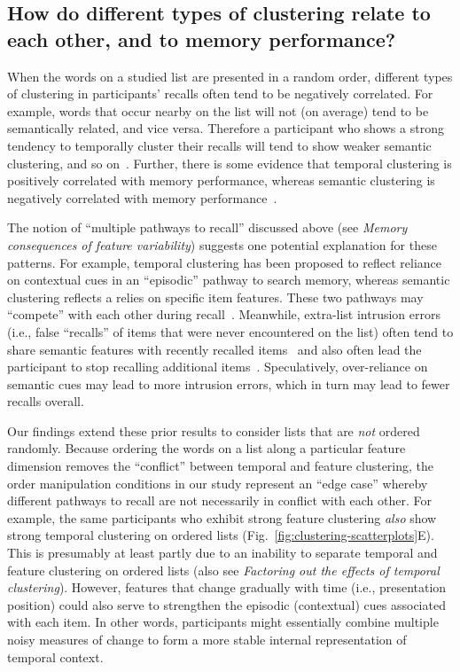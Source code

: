\documentclass[11pt]{article}
\begin{document}
\subsection*{How do different types of clustering relate to each other, and to memory performance?}

When the words on a studied list are presented in a random order, different types
of clustering in participants' recalls often tend to be negatively correlated.
For example, words that occur nearby on the list will not (on average)
tend to be semantically related, and vice versa. Therefore a participant who
shows a strong tendency to temporally cluster their recalls will tend to show weaker
semantic clustering, and so on~\citep{HealUitv19, HowaKaha02b, SedeEtal10}.  Further,
there is some evidence that temporal clustering is positively correlated with
memory performance, whereas semantic clustering is negatively correlated with
memory performance~\citep{SedeEtal10}.

The notion of ``multiple pathways to recall'' discussed above (see
\textit{Memory consequences of feature variability}) suggests one potential
explanation for these patterns. For example, temporal clustering has been
proposed to reflect reliance on contextual cues in an ``episodic'' pathway to
search memory, whereas semantic clustering reflects a relies on specific item
features. These two pathways may ``compete'' with each other during
recall~\citep{SochEtal09}. Meanwhile, extra-list intrusion errors (i.e., false
``recalls'' of items that were never encountered on the list) often tend to
share semantic features with recently recalled items~\citep{ZaroEtal06} and
also often lead the participant to stop recalling additional
items~\citep{MillEtal12a}. Speculatively, over-reliance on semantic cues may lead to
more intrusion errors, which in turn may lead to fewer recalls overall.

Our findings extend these prior results to consider lists that are \textit{not}
ordered randomly. Because ordering the words on a list along a particular
feature dimension removes the ``conflict'' between temporal and feature
clustering, the order manipulation conditions in our study represent an ``edge
case'' whereby different pathways to recall are not necessarily in conflict
with each other. For example, the same participants who exhibit strong feature
clustering \textit{also} show strong temporal clustering on ordered lists
(Fig.~\ref{fig:clustering-scatterplots}E). This is presumably at least partly
due to an inability to separate temporal and feature clustering on ordered
lists (also see \textit{Factoring out the effects of temporal clustering}).
However, features that change gradually with time (i.e., presentation position)
could also serve to strengthen the episodic (contextual) cues associated with
each item. In other words, participants might essentially combine multiple
noisy measures of change to form a more stable internal representation of
temporal context.
\end{document}
